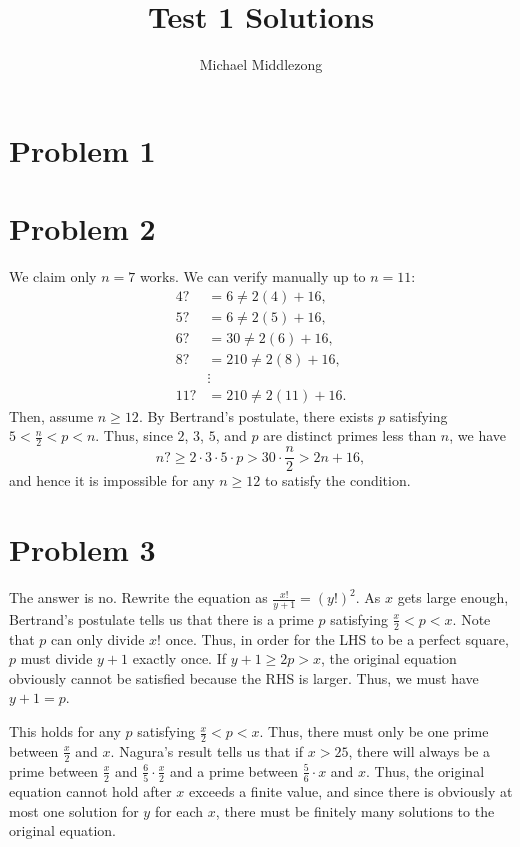 \documentclass{scrartcl}
\title{Test 1 Solutions}
\author{Michael Middlezong}
\begin{document}
\maketitle

\section*{Problem 1}

\pagebreak
\section*{Problem 2}
We claim only $n=7$ works. We can verify manually up to $n = 11$:
\begin{align*}
    4? &= 6 \neq 2(4)+16, \\
    5? &= 6 \neq 2(5)+16, \\
    6? &= 30 \neq 2(6)+16, \\
    8? &= 210 \neq 2(8)+16, \\
    &\vdots \\
    11? &= 210 \neq 2(11)+16.
\end{align*}
Then, assume $n \geq 12$. By Bertrand's postulate, there exists $p$ satisfying $5 < \frac{n}{2} < p < n$. Thus, since $2$, $3$, $5$, and $p$ are distinct primes less than $n$, we have 
\[ n? \geq 2 \cdot 3 \cdot 5 \cdot p > 30 \cdot \frac{n}{2} > 2n + 16, \]
and hence it is impossible for any $n \geq 12$ to satisfy the condition.
\pagebreak
\section*{Problem 3}
The answer is no. Rewrite the equation as $\frac{x!}{y+1} = (y!)^2$. As $x$ gets large enough, Bertrand's postulate tells us that there is a prime $p$ satisfying $\frac{x}{2} < p < x$. Note that $p$ can only divide $x!$ once. Thus, in order for the LHS to be a perfect square, $p$ must divide $y+1$ exactly once. If $y+1 \geq 2p > x$, the original equation obviously cannot be satisfied because the RHS is larger. Thus, we must have $y + 1 = p$.

This holds for any $p$ satisfying $\frac{x}{2} < p < x$. Thus, there must only be one prime between $\frac{x}{2}$ and $x$. Nagura's result tells us that if $x > 25$, there will always be a prime between $\frac{x}{2}$ and $\frac65 \cdot \frac{x}{2}$ and a prime between $\frac56 \cdot x$ and $x$. Thus, the original equation cannot hold after $x$ exceeds a finite value, and since there is obviously at most one solution for $y$ for each $x$, there must be finitely many solutions to the original equation.
\end{document}
